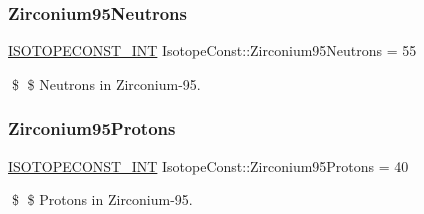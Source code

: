 \subsubsection{\texorpdfstring{Zirconium95\+Neutrons}{Zirconium95Neutrons}}
{\footnotesize\ttfamily \mbox{\hyperlink{group___isotope_const-_macros_ga5f18360b3e99483a35c32d789e62621c}{I\+S\+O\+T\+O\+P\+E\+C\+O\+N\+S\+T\+\_\+\+I\+NT}} Isotope\+Const\+::\+Zirconium95\+Neutrons = 55}

\$ \$ Neutrons in Zirconium-\/95. \mbox{\label{group___isotope_const-_zirconium-_zr95_gade9d7292fd409335bc579b568ede81f7}} 
\subsubsection{\texorpdfstring{Zirconium95\+Protons}{Zirconium95Protons}}
{\footnotesize\ttfamily \mbox{\hyperlink{group___isotope_const-_macros_ga5f18360b3e99483a35c32d789e62621c}{I\+S\+O\+T\+O\+P\+E\+C\+O\+N\+S\+T\+\_\+\+I\+NT}} Isotope\+Const\+::\+Zirconium95\+Protons = 40}

\$ \$ Protons in Zirconium-\/95. 